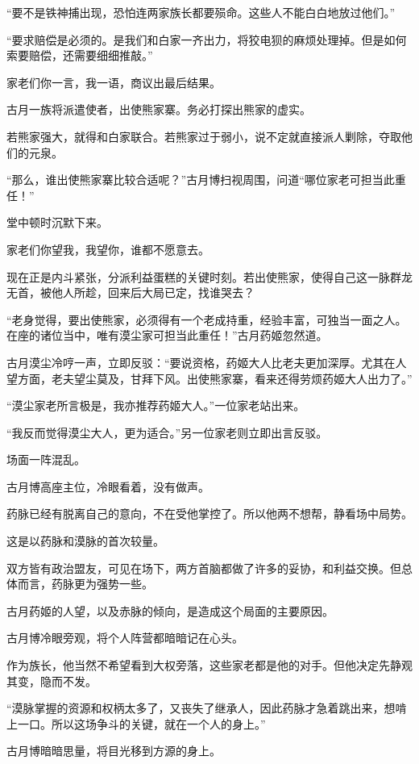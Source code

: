 \begin{this_body}
“要不是铁神捕出现，恐怕连两家族长都要殒命。这些人不能白白地放过他们。”

“要求赔偿是必须的。是我们和白家一齐出力，将狡电狈的麻烦处理掉。但是如何索要赔偿，还需要细细推敲。”

家老们你一言，我一语，商议出最后结果。

古月一族将派遣使者，出使熊家寨。务必打探出熊家的虚实。

若熊家强大，就得和白家联合。若熊家过于弱小，说不定就直接派人剿除，夺取他们的元泉。

“那么，谁出使熊家寨比较合适呢？”古月博扫视周围，问道“哪位家老可担当此重任！”

堂中顿时沉默下来。

家老们你望我，我望你，谁都不愿意去。

现在正是内斗紧张，分派利益蛋糕的关键时刻。若出使熊家，使得自己这一脉群龙无首，被他人所趁，回来后大局已定，找谁哭去？

“老身觉得，要出使熊家，必须得有一个老成持重，经验丰富，可独当一面之人。在座的诸位当中，唯有漠尘家可担当此重任！”古月药姬忽然道。

古月漠尘冷哼一声，立即反驳：“要说资格，药姬大人比老夫更加深厚。尤其在人望方面，老夫望尘莫及，甘拜下风。出使熊家寨，看来还得劳烦药姬大人出力了。”

“漠尘家老所言极是，我亦推荐药姬大人。”一位家老站出来。

“我反而觉得漠尘大人，更为适合。”另一位家老则立即出言反驳。

场面一阵混乱。

古月博高座主位，冷眼看着，没有做声。

药脉已经有脱离自己的意向，不在受他掌控了。所以他两不想帮，静看场中局势。

这是以药脉和漠脉的首次较量。

双方皆有政治盟友，可见在场下，两方首脑都做了许多的妥协，和利益交换。但总体而言，药脉更为强势一些。

古月药姬的人望，以及赤脉的倾向，是造成这个局面的主要原因。

古月博冷眼旁观，将个人阵营都暗暗记在心头。

作为族长，他当然不希望看到大权旁落，这些家老都是他的对手。但他决定先静观其变，隐而不发。

“漠脉掌握的资源和权柄太多了，又丧失了继承人，因此药脉才急着跳出来，想啃上一口。所以这场争斗的关键，就在一个人的身上。”

古月博暗暗思量，将目光移到方源的身上。


\end{this_body}
